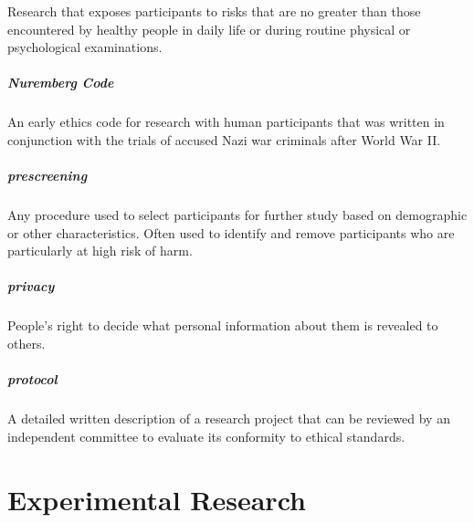\documentclass[
]{krantz}
\begin{document}
Research that exposes participants to risks that are no greater than those encountered by healthy people in daily life or during routine physical or psychological examinations.

\hypertarget{nuremberg-code}{%
\paragraph*{Nuremberg Code}\label{nuremberg-code}}

An early ethics code for research with human participants that was written in conjunction with the trials of accused Nazi war criminals after World War II.

\hypertarget{prescreening}{%
\paragraph*{prescreening}\label{prescreening}}

Any procedure used to select participants for further study based on demographic or other characteristics. Often used to identify and remove participants who are particularly at high risk of harm.

\hypertarget{privacy}{%
\paragraph*{privacy}\label{privacy}}

People's right to decide what personal information about them is revealed to others.

\hypertarget{protocol}{%
\paragraph*{protocol}\label{protocol}}

A detailed written description of a research project that can be reviewed by an independent committee to evaluate its conformity to ethical standards.

\hypertarget{experimental-research}{%
\chapter{Experimental Research}\label{experimental-research}}
\end{document}
